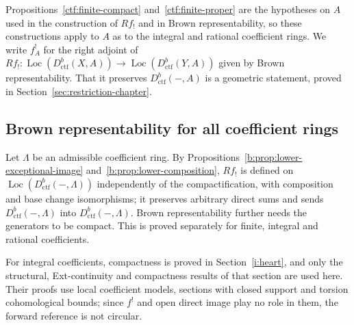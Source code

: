 \documentclass[11pt,a4paper]{article}
\numberwithin{equation}{section}
\theoremstyle{definition}
\theoremstyle{remark}
\newcommand{\Loc}{\operatorname{Loc}}
\newcommand{\Dctf}{D^b_{\mathrm{ctf}}}
\begin{document}
Propositions~\ref{ctf:finite-compact} and~\ref{ctf:finite-proper} are
the hypotheses on $A$ used in the construction of $Rf_!$ and in Brown
representability, so these constructions apply to $A$ as to the
integral and rational coefficient rings. We write $f_A^!$ for the right
adjoint of $Rf_!\colon\Loc(\Dctf(X,A))\to\Loc(\Dctf(Y,A))$ given by Brown
representability. That it preserves $\Dctf(-,A)$ is a geometric
statement, proved in Section~\ref{sec:restriction-chapter}.


\subsection{Brown representability for all coefficient rings}

Let $\Lambda$ be an admissible coefficient ring. By
Propositions~\ref{b:prop:lower-exceptional-image}
and~\ref{b:prop:lower-composition}, $Rf_!$ is defined on
$\Loc(\Dctf(-,\Lambda))$ independently of the compactification, with
composition and base change isomorphisms; it preserves arbitrary
direct sums and sends $\Dctf(-,\Lambda)$ into $\Dctf(-,\Lambda)$.
Brown representability further needs the generators to be compact.
This is proved separately for finite, integral and rational
coefficients.

For integral coefficients, compactness is proved in
Section~\ref{i:heart}, and only the structural, Ext-continuity and
compactness results of that section are used here. Their proofs use
local coefficient models, sections with closed support and torsion
cohomological bounds; since $f^!$ and open direct image play no role in
them, the forward reference is not circular.
\end{document}
